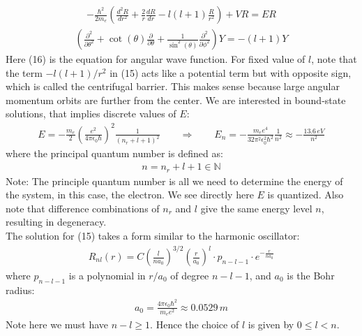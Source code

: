 \documentclass[11pt]{article}
\theoremstyle{break}
\theoremstyle{break}
\newcommand{\N}{\mathbb{N}}
\newcommand{\pd}{\partial}
\newcommand{\note}{\color{red}Note: \color{black}}
\begin{document}
\begin{align}
-\frac{\hbar^2}{2m_e}\left( \frac{d^2R}{dr^2}+\frac{2}{r}\frac{dR}{dr} - l(l+1) \frac{R}{r^2}\right) + V R = ER
\end{align}
\begin{align}
\left( \frac{\pd^2}{\pd \theta^2}+ \cot(\theta) \frac{\pd}{\pd \theta}+ \frac{1}{\sin^2(\theta)}\frac{\pd^2}{\pd \phi^2}\right) Y = -(l+1) Y
\end{align}
Here (16) is the equation for angular wave function. For fixed value of $l$, note that the term $-l(l+1)/r^2$ in (15) acts like a potential term but with opposite sign, which is called the centrifugal barrier. This makes sense because large angular momentum orbits are further from the center. We are interested in bound-state solutions, that implies discrete values of $E$:
\begin{align*}
E = -\frac{m_e}{2}\left( \frac{e^2}{4\pi \epsilon_0 \hbar}\right)^2 \frac{1}{(n_r+l+1)^2} \qquad \Rightarrow \qquad E_n = -\frac{m_ee^4}{32\pi^2 \epsilon_0^2 \hbar^2}\frac{1}{n^2} \approx -\frac{13.6\, eV}{n^2}
\end{align*}
where the principal quantum number is defined as:
\begin{align*}
n = n_r + l + 1 \in \N
\end{align*}
\note The principle quantum number is all we need to determine the energy of the system, in this case, the electron. We see directly here $E$ is quantized. Also note that difference combinations of $n_r$ and $l$ give the same energy level $n$, resulting in degeneracy. \\ 

The solution for (15) takes a form similar to the harmonic oscillator:
\begin{align*}
R_{nl}(r) = C\left( \frac{l}{na_0}\right)^{3/2}\left( \frac{r}{a_0}\right)^l \cdot p_{n-l-1}\cdot e^{-\frac{r}{na_0}}
\end{align*}
where $p_{n-l-1}$ is a polynomial in $r/a_0$ of degree $n-l-1$, and $a_0$ is the Bohr radius:
\begin{align*}
a_0 = \frac{4\pi \epsilon_0 \hbar^2}{m_e e^2} \approx 0.0529\, m
\end{align*}
Note here we must have $n-l\geq 1$. Hence the choice of $l$ is given by $0 \leq l < n$. \\
\end{document}
